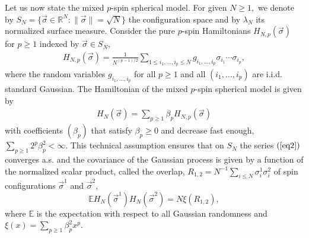 \documentclass[12pt]{article}
\newcommand{\vsi}{{\vec{\sigma}}}
\newenvironment{Proof of lemma}{\noindent{\bf Proof of Lemma}}{\hfill$\Box$\newline}
\newenvironment{Proof of theorem}{\noindent{\bf Proof of Theorem}}{\hfill{\footnotesize${\square}$}\newline}
\newenvironment{Proof of theorems}{\noindent{\bf Proof of Theorems}}{\hfill$\Box$\newline}
\newenvironment{Proof of proposition}{\noindent{\bf Proof of Proposition}}{\hfill$\Box$\newline}
\newenvironment{Proof of propositions}{\noindent{\bf Proof of Propositions}}{\hfill$\Box$\newline}
\newenvironment{Proof of exercise}{\noindent{\it Proof of Exercise:}}{\hfill$\Box$}
\numberwithin{equation}{section}
\begin{document}
Let us now state the mixed $p$-spin spherical model. For given $N\geq 1,$ we denote by $S_N=\{\vsi\in\mathbb{R}^N:\|\vsi\|=\sqrt{N}\}$ the  configuration space and by $\lambda_N$ its normalized surface measure. Consider the pure $p$-spin Hamiltonians $H_{N,p}(\vsi)$ for $p\geq 1$ indexed by $\vsi\in S_N,$
\begin{align}\label{eq1}
H_{N,p}(\vsi)=\frac{1}{N^{(p-1)/2}}\sum_{1\leq i_1,\ldots,i_p\leq N}g_{i_1,\ldots,i_p}\sigma_{i_1}\cdots\sigma_{i_p},
\end{align}
where the random variables $g_{i_1,\ldots,i_p}$ for all $p\geq 1$ and all $(i_1,\ldots,i_p)$ are i.i.d. standard Gaussian. The Hamiltonian of the mixed $p$-spin spherical model is given by
\begin{align}
\label{eq2}
H_N(\vsi)=\sum_{p\geq 1}\beta_p H_{N,p}(\vsi)
\end{align}
with coefficients $(\beta_p)$ that satisfy $\beta_p\geq 0$ and decrease fast enough, $\sum_{p\geq 1}2^p\beta_p^2<\infty.$ This technical assumption ensures that on $S_N$ the series $(\ref{eq2})$ converges a.s. and the covariance of the Gaussian process
is given by a function of the normalized scalar product, called the overlap, $R_{1,2}=N^{-1}\sum_{i\leq N}\sigma_i^1\sigma_i^2$
of spin configurations $\vsi^1$ and $\vsi^2,$
$$
\mathbb{E}H_N(\vsi^1)H_N(\vsi^2)=N\xi(R_{1,2}),
$$
where $\mathbb{E}$ is the expectation with respect to all Gaussian randomness and $\xi(x)=\sum_{p\geq 1}\beta_p^2 x^p.$ 
\end{document}
